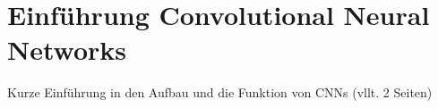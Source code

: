 \chapter{Einführung Convolutional Neural Networks}
Kurze Einführung in den Aufbau und die Funktion von CNNs (vllt. 2 Seiten)
